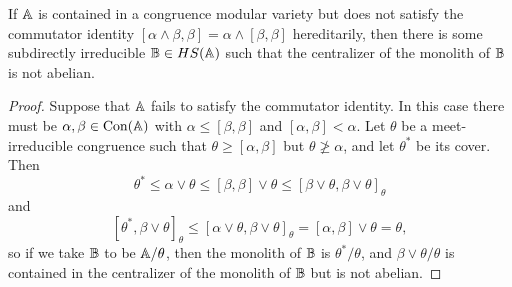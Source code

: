 \documentclass[letterpaper,11pt]{article}
\DeclareMathOperator{\Con}{Con}
\begin{document}
\begin{prop} If $\mathbb{A}$ is contained in a congruence modular variety but does not satisfy the commutator identity $[\alpha \wedge \beta,\beta] = \alpha \wedge [\beta,\beta]$ hereditarily, then there is some subdirectly irreducible $\mathbb{B} \in HS(\mathbb{A})$ such that the centralizer of the monolith of $\mathbb{B}$ is not abelian.
\end{prop}
\begin{proof} Suppose that $\mathbb{A}$ fails to satisfy the commutator identity. In this case there must be $\alpha, \beta \in \Con(\bA)$ with $\alpha \le [\beta,\beta]$ and $[\alpha,\beta] < \alpha$. Let $\theta$ be a meet-irreducible congruence such that $\theta \ge [\alpha,\beta]$ but $\theta \not\ge \alpha$, and let $\theta^*$ be its cover. Then
\[
\theta^* \le \alpha\vee\theta \le [\beta,\beta]\vee \theta \le [\beta\vee\theta,\beta\vee\theta]_\theta
\]
and
\[
[\theta^*,\beta\vee\theta]_\theta \le [\alpha\vee\theta,\beta\vee\theta]_\theta = [\alpha,\beta]\vee\theta = \theta,
\]
so if we take $\mathbb{B}$ to be $\mathbb{A}/\theta$, then the monolith of $\mathbb{B}$ is $\theta^*/\theta$, and $\beta\vee\theta/\theta$ is contained in the centralizer of the monolith of $\mathbb{B}$ but is not abelian.
\end{proof}
\end{document}

